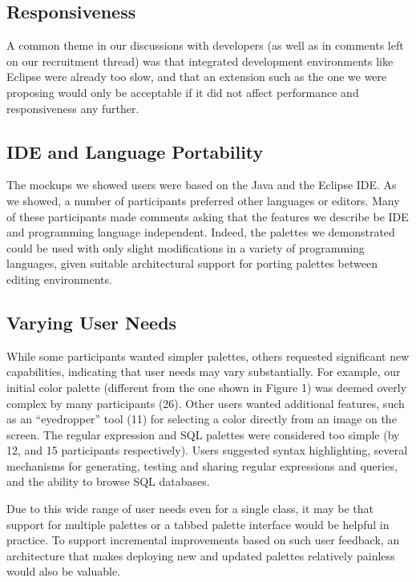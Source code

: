 \documentclass[10pt, conference, compsocconf]{IEEEtran}
\begin{document}
\subsection{Responsiveness}

A common theme in our discussions with developers (as well as in comments left on our recruitment thread) was that integrated development environments like Eclipse were already too slow, and that an extension such as the one we were proposing would only be acceptable if it did not affect performance and responsiveness any further.

\subsection{IDE and Language Portability}

The mockups we showed users were based on the Java and the Eclipse IDE. As we showed, a number of participants preferred other languages or editors. Many of these participants made comments asking that the features we describe be IDE and programming language independent. Indeed, the palettes we demonstrated could be used with only slight modifications in a variety of programming languages, given suitable architectural support for porting palettes between editing environments.

\subsection{Varying User Needs}

While some participants wanted simpler palettes, others requested significant new capabilities, indicating that user needs may vary substantially. For example, our initial color palette (different from the one shown in Figure 1) was deemed overly complex by many participants (26). Other users wanted additional features, such as an ``eyedropper'' tool (11) for selecting a color directly from an image on the screen. The regular expression and SQL palettes were considered too simple (by 12, and 15 participants respectively). Users suggested syntax highlighting, several mechanisms for generating, testing and sharing regular expressions and queries, and the ability to browse SQL databases. 

Due to this wide range of user needs even for a single class, it may be that support for multiple palettes or a tabbed palette interface would be helpful in practice. To support incremental improvements based on such user feedback, an architecture that makes deploying new and updated palettes relatively painless would also be valuable.
\end{document}
